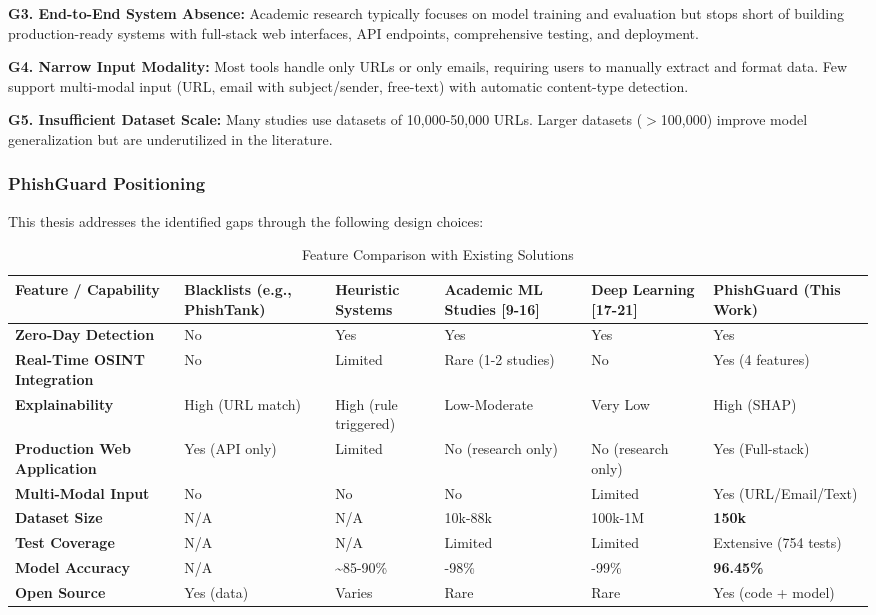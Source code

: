 \textbf{G3. End-to-End System Absence:} Academic research typically
focuses on model training and evaluation but stops short of building
production-ready systems with full-stack web interfaces, API endpoints,
comprehensive testing, and deployment.

\textbf{G4. Narrow Input Modality:} Most tools handle only URLs or only
emails, requiring users to manually extract and format data. Few support
multi-modal input (URL, email with subject/sender, free-text) with
automatic content-type detection.

\textbf{G5. Insufficient Dataset Scale:} Many studies use datasets of
10,000-50,000 URLs. Larger datasets ($>$100,000) improve model
generalization but are underutilized in the literature.

\subsubsection{PhishGuard Positioning}\label{phishguard-positioning}

This thesis addresses the identified gaps through the following design
choices:

\setlength{\tabcolsep}{3pt}
\footnotesize
\begin{longtable}{
>{\raggedright\arraybackslash}p{}
>{\raggedright\arraybackslash}p{}
>{\raggedright\arraybackslash}p{}
>{\raggedright\arraybackslash}p{}
>{\raggedright\arraybackslash}p{}
>{\raggedright\arraybackslash}p{}}
\caption{Feature Comparison with Existing Solutions} \\
\toprule
Feature / Capability & Blacklists (e.g., PhishTank) & Heuristic Systems & Academic ML Studies {[}9-16{]} & Deep Learning {[}17-21{]} & \textbf{PhishGuard (This Work)} \\
\midrule

\textbf{Zero-Day Detection} & No & Yes & Yes & Yes & Yes \\
\textbf{Real-Time OSINT Integration} & No & Limited & Rare (1-2 studies)
& No & Yes (4 features) \\
\textbf{Explainability} & High (URL match) & High (rule triggered) &
Low-Moderate & Very Low & High (SHAP) \\
\textbf{Production Web Application} & Yes (API only) & Limited & No
(research only) & No (research only) & Yes (Full-stack) \\
\textbf{Multi-Modal Input} & No & No & No & Limited & Yes
(URL/Email/Text) \\
\textbf{Dataset Size} & N/A & N/A & 10k-88k & 100k-1M & \textbf{150k} \\
\textbf{Test Coverage} & N/A & N/A & Limited & Limited & Extensive (754
tests) \\
\textbf{Model Accuracy} & N/A & \textasciitilde85-90\% & 96-98\% &
97-99\% & \textbf{96.45\%} \\
\textbf{Open Source} & Yes (data) & Varies & Rare & Rare & Yes (code +
model) \\

\bottomrule
\end{longtable}
\normalsize

